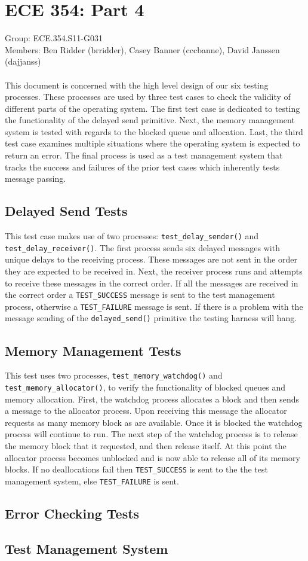 \documentclass[oneside]{article}
\begin{document}
\lstset{language=C, 
        frame=single, 
        breaklines=true,
        basicstyle=\small\ttfamily,
        columns=fullflexible}
\section*{ECE 354: Part 4}
Group: ECE.354.S11-G031 \\
Members: Ben Ridder (brridder), Casey Banner (cccbanne), 
David Janssen (dajjanss) \\ \\
This document is concerned with the high level design of our six testing 
processes. These processes are used by three test cases to check the 
validity of different parts of the operating system. The first test case is 
dedicated to testing the functionality of the delayed send primitive. Next, the 
memory management system is tested with regards to the blocked queue and 
allocation. Last, the third test case examines multiple situations where the 
operating system is expected to return an error. The final process is used as a 
test management system that tracks the success and failures of the prior test 
cases which inherently tests message passing. 

\subsection*{Delayed Send Tests}
This test case makes use of two processes: \texttt{test\_delay\_sender()} and 
\texttt{test\_delay\_receiver()}. The first process sends six delayed messages 
with unique delays to the receiving process. These messages are not sent in the 
order they are expected to be received in. Next, the receiver process runs and 
attempts to receive these messages in the correct order. If all the messages 
are received in the correct order a \texttt{TEST\_SUCCESS} message is sent to 
the test management process, otherwise a \texttt{TEST\_FAILURE} message is sent.
 If there is a problem with the message sending of the \texttt{delayed\_send()} 
primitive the testing harness will hang.

\subsection*{Memory Management Tests}
This test uses two processes, \texttt{test\_memory\_watchdog()} and 
\texttt{test\_memory\_allocator()}, to verify the functionality of blocked 
queues and memory allocation. First, the watchdog process allocates a block and 
then sends a message to the allocator process. Upon receiving this message the 
allocator requests as many memory block as are available. Once it is blocked the 
watchdog process will continue to run. The next step of the watchdog process is 
to release the memory block that it requested, and then release itself. At this 
point the allocator process becomes unblocked and is now able to release all of 
its memory blocks. If no deallocations fail then \texttt{TEST\_SUCCESS} is sent 
to the the test management system, else \texttt{TEST\_FAILURE} is sent.

\subsection*{Error Checking Tests}

\subsection*{Test Management System}
\end{document}
